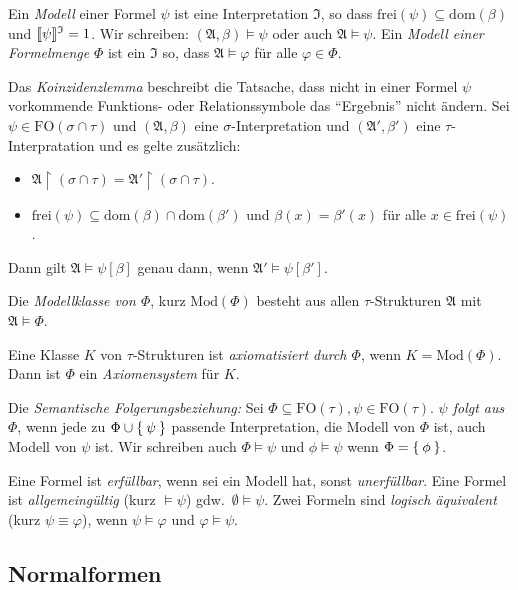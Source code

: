 \documentclass[a4paper,parskip=half*,DIV=15,fontsize=11pt]{scrartcl}
\DeclarePairedDelimiter\interpret{\llbracket}{\rrbracket}
\newcommand{\J}{\mathfrak{I}}
\newcommand{\A}{\mathfrak{A}}
\newcommand{\FO}{\mathrm{FO}}
\newcommand{\dom}{\mathrm{dom}}
\newcommand{\frei}{\mathrm{frei}}
\newcommand{\Mod}{\mathrm{Mod}}
\begin{document}
Ein \emph{Modell} einer Formel $\psi$ ist eine Interpretation $\J$, so dass $\frei(\psi) \subseteq \dom(\beta)$ und $\interpret{\psi}^\J = 1$. Wir schreiben: $(\A, \beta) \models \psi$ oder auch $\A \models \psi$. Ein \emph{Modell einer Formelmenge} $\Phi$ ist ein $\J$ so, dass $\A \models \varphi$ für alle $\varphi \in \Phi$.

Das \emph{Koinzidenzlemma} beschreibt die Tatsache, dass nicht in einer Formel $\psi$ vorkommende Funktions- oder Relationssymbole das ``Ergebnis'' nicht ändern. Sei $\psi \in \FO(\sigma \cap \tau)$ und $(\A, \beta)$ eine $\sigma$-Interpretation und $(\A', \beta')$ eine $\tau$-Interpratation und es gelte zusätzlich:
\begin{itemize}
    \item $\A \upharpoonright (\sigma \cap \tau) = \A' \upharpoonright (\sigma \cap \tau)$.
    \item $\frei(\psi) \subseteq \dom(\beta) \cap \dom(\beta')$ und $\beta(x) = \beta'(x)$ für alle $x \in \frei(\psi)$.
\end{itemize}

Dann gilt $\A \models \psi[\beta]$ genau dann, wenn $\A' \models \psi[\beta']$.

Die \emph{Modellklasse von $\Phi$}, kurz $\Mod(\Phi)$ besteht aus allen $\tau$-Strukturen $\A$ mit $\A \models \Phi$.

Eine Klasse $K$ von $\tau$-Strukturen ist \emph{axiomatisiert durch $\Phi$}, wenn $K = \Mod(\Phi)$. Dann ist $\Phi$ ein \emph{Axiomensystem} für $K$.

Die \emph{Semantische Folgerungsbeziehung:} Sei $\Phi \subseteq \FO(\tau), \psi \in \FO(\tau)$. \emph{$\psi$ folgt aus $\Phi$}, wenn jede zu $\Phi \cup \Set{\psi}$ passende Interpretation, die Modell von $\Phi$ ist, auch Modell von $\psi$ ist. Wir schreiben auch $\Phi \models \psi$ und $\phi \models \psi$ wenn $\Phi = \Set{\phi}$.

Eine Formel ist \emph{erfüllbar}, wenn sei ein Modell hat, sonst \emph{unerfüllbar}. Eine Formel ist \emph{allgemeingültig} (kurz $\models \psi$) gdw.\ $\emptyset \models \psi$. Zwei Formeln sind \emph{logisch äquivalent} (kurz $\psi \equiv \varphi$), wenn $\psi \models \varphi$ und $\varphi \models \psi$.


\subsection{Normalformen}
\end{document}
